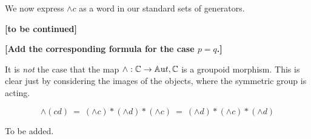 \bigskip 
We now express $\wedge c$ as a word in our standard sets of generators. 

\medskip\noindent
{\bf [to be continued]}

\newpage\noindent
{\bf [Add the corresponding formula for the case $p=q$.]}

\bigskip
It is \emph{not} the case that the map $\wedge  : \mathbb{C} \to \mathbb{A}{\mathrm ut},\mathbb{C}$ 
is a groupoid morphism. 
This is clear just by considering the images of the objects, 
where the symmetric group is acting.

\begin{lem}
$$
\wedge(cd) 
~=~ (\wedge  c)*(\wedge  d)*(\wedge  c) 
~=~ (\wedge  d)*(\wedge  c)*(\wedge  d) 
$$
\end{lem}
\begin{pf}
To be added.
\end{pf}


